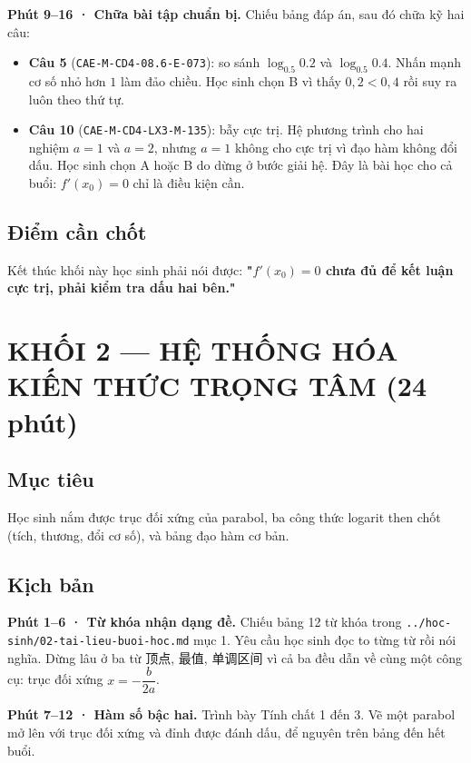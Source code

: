 \documentclass[11pt, a4paper]{article}
\begin{document}
\textbf{Phút 9–16 · Chữa bài tập chuẩn bị.} Chiếu bảng đáp án, sau đó chữa kỹ hai câu:

\begin{itemize}[leftmargin=1.4em, itemsep=2pt]
\item \textbf{Câu 5} (\texttt{CAE-M-CD4-08.6-E-073}): so sánh $\log_{0.5} 0.2$ và $\log_{0.5} 0.4$. Nhấn mạnh cơ số nhỏ hơn $1$ làm đảo chiều. Học sinh chọn B vì thấy $0{,}2 < 0{,}4$ rồi suy ra luôn theo thứ tự.
\item \textbf{Câu 10} (\texttt{CAE-M-CD4-LX3-M-135}): bẫy cực trị. Hệ phương trình cho hai nghiệm $a = 1$ và $a = 2$, nhưng $a = 1$ không cho cực trị vì đạo hàm không đổi dấu. Học sinh chọn A hoặc B do dừng ở bước giải hệ. Đây là bài học cho cả buổi: $f'(x_0) = 0$ chỉ là điều kiện cần.
\end{itemize}

\subsection{Điểm cần chốt}

Kết thúc khối này học sinh phải nói được: \textbf{"$f'(x_0) = 0$ chưa đủ để kết luận cực trị, phải kiểm tra dấu hai bên."}

\section{KHỐI 2 — HỆ THỐNG HÓA KIẾN THỨC TRỌNG TÂM (24 phút)}

\subsection{Mục tiêu}

Học sinh nắm được trục đối xứng của parabol, ba công thức logarit then chốt (tích, thương, đổi cơ số), và bảng đạo hàm cơ bản.

\subsection{Kịch bản}

\textbf{Phút 1–6 · Từ khóa nhận dạng đề.} Chiếu bảng 12 từ khóa trong \texttt{../hoc-sinh/02-tai-lieu-buoi-hoc.md} mục 1. Yêu cầu học sinh đọc to từng từ rồi nói nghĩa. Dừng lâu ở ba từ 顶点, 最值, 单调区间 vì cả ba đều dẫn về cùng một công cụ: trục đối xứng $x = -\dfrac{b}{2a}$.

\textbf{Phút 7–12 · Hàm số bậc hai.} Trình bày Tính chất 1 đến 3. Vẽ một parabol mở lên với trục đối xứng và đỉnh được đánh dấu, để nguyên trên bảng đến hết buổi.
\end{document}
